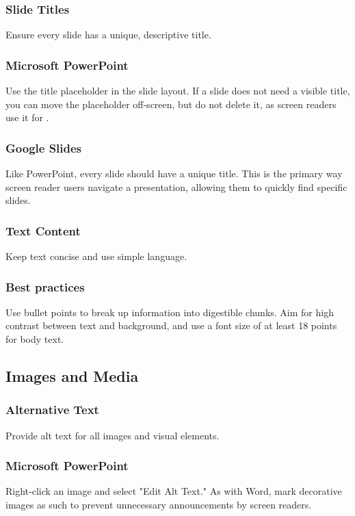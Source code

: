 \subsubsection{Slide Titles}\label{ch15:sssec:slide-titles}
Ensure every slide has a unique, descriptive title.

\subsubsection{Microsoft PowerPoint}\label{ch15:sssec:ppt-titles}
Use the title placeholder in the slide layout. If a slide does not need a visible title, you can move the placeholder off-screen, but do not delete it, as screen readers use it for .

\subsubsection{Google Slides}\label{ch15:sssec:slides-titles}
Like PowerPoint, every slide should have a unique title. This is the primary way screen reader users navigate a presentation, allowing them to quickly find specific slides.

\subsubsection{Text Content}\label{ch15:sssec:text-content}
Keep text concise and use simple language.

\subsubsection{Best practices}\label{ch15:sssec:text-content-best-practices}
Use bullet points to break up information into digestible chunks. Aim for high contrast between text and background, and use a font size of at least 18 points for body text.

\subsection{Images and Media}\label{ch15:ssec:images-media-slides}

\subsubsection{Alternative Text}\label{ch15:sssec:alt-text-slides}
Provide alt text for all images and visual elements.

\subsubsection{Microsoft PowerPoint}\label{ch15:sssec:ppt-alt-text}
Right-click an image and select "Edit Alt Text." As with Word, mark decorative images as such to prevent unnecessary announcements by screen readers.

